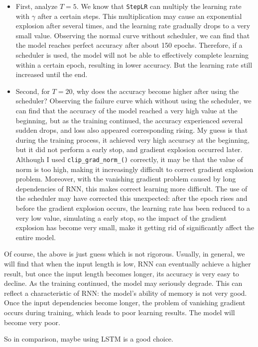 \begin{itemize}
  \item {First, analyze $T=5$. We know that \texttt{StepLR} can multiply the learning rate with $\gamma$ after a certain steps.
      This multiplication may cause an exponential explosion after several times, and the learning rate gradually drops to a very small value.
      Observing the normal curve without scheduler, we can find that the model reaches perfect accuracy after about 150 epochs.
      Therefore, if a scheduler is used, the model will not be able to effectively complete learning within a certain epoch, resulting in lower accuracy.
      But the learning rate still increased until the end.
    }

  \item {Second, for $T=20$, why does the accuracy become higher after using the scheduler?
      Observing the failure curve which without using the scheduler, we can find that the accuracy of the model reached a very high value at the beginning,
      but as the training continued, the accuracy experienced several sudden drops, and loss also appeared corresponding rising.
      My guess is that during the training process, it achieved very high accuracy at the beginning, but it did not perform a early stop, and gradient explosion occurred later.
      Although I used \texttt{clip\_grad\_norm\_()} correctly, it may be that the value of norm is too high, making it increasingly difficult to correct gradient explosion problem.
      Moreover, with the vanishing gradient problem caused by long dependencies of RNN, this makes correct learning more difficult.
      The use of the scheduler may have corrected this unexpected:
      after the epoch rises and before the gradient explosion occurs, the learning rate has been reduced to a very low value, simulating a early stop,
      so the impact of the gradient explosion has become very small, make it getting rid of significantly affect the entire model.
    }
\end{itemize}

Of course, the above is just guess which is not rigorous.
Usually, in general, we will find that when the input length is low, RNN can eventually achieve a higher result, but once the input length becomes longer, its accuracy is very easy to decline.
As the training continued, the model may seriously degrade.
This can reflect a characteristic of RNN: the model's ability of memory is not very good. Once the input dependencies become longer, the problem of vanishing gradient occurs during training, which leads to poor learning results.
The model will become very poor.

So in comparison, maybe using LSTM is a good choice.
